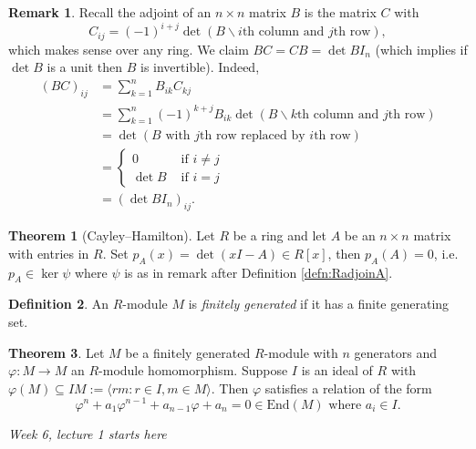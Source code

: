 \documentclass[a4paper]{article}
\newcommand{\End}{\text{End}}
\theoremstyle{definition}
\newtheorem{defn}{Definition}[subsection]
\newtheorem{thm}[defn]{Theorem}
\newtheorem*{remark}{Remark}
\begin{document}
\begin{remark}
Recall the adjoint of an $n\times n$ matrix $B$ is the matrix $C$ with 
\[
C_{ij}=(-1)^{i+j} \det \left(B\backslash i\text{th column and }j\text{th row} \right),
\]
which makes sense over any ring. We claim $BC=CB=\det B I_n$ (which implies if $\det B$ is a unit then $B$ is invertible). Indeed,
\[
\begin{aligned}
(BC)_{ij} &= \sum_{k=1}^n B_{ik} C_{kj}\\
&=\sum_{k=1}^n (-1)^{k+j} B_{ik} \det \left(B\backslash k\text{th column and }j\text{th row} \right)\\
&=\det \left(B\text{ with }j\text{th row replaced by }i\text{th row}\right)\\
&=\left\{ \begin{aligned}
  0 &\text{ if } i\neq j\\ \det B &\text{ if } i= j
\end{aligned} \right. \\
&=\left(\det B I_n\right)_{ij}.
\end{aligned}
\]
\end{remark}

\begin{thm}[Cayley–Hamilton]
Let $R$ be a ring and let $A$ be an $n\times n$ matrix with entries in $R$. Set $p_A(x)=\det (xI-A)\in R[x]$, then $p_A(A)=0$, i.e. $p_A\in\ker\psi$ where $\psi$ is as in remark after Definition \ref{defn:RadjoinA}.
\end{thm}

\begin{defn}
An $R$-module $M$ is \textit{finitely generated} if it has a finite generating set.
\end{defn}

\begin{thm}
\label{thm:generalCH}
Let $M$ be a finitely generated $R$-module with $n$ generators and $\varphi:M\rightarrow M$ an $R$-module homomorphism. Suppose $I$ is an ideal of $R$ with $\varphi(M)\subseteq IM:=\langle rm:r\in I,m\in M\rangle$. Then $\varphi$ satisfies a relation of the form
\[
\varphi^n + a_1 \varphi^{n-1} + a_{n-1}\varphi + a_n=0 \in\End(M) \text{ where } a_i\in I.
\]
\end{thm}

\begin{flushright}
\textit{Week 6, lecture 1 starts here}
\end{flushright}
\end{document}
